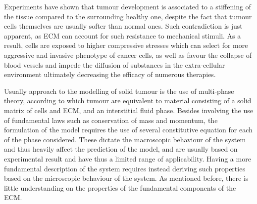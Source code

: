 \documentclass[runningheads]{llncs}
\begin{document}
Experiments have shown that tumour development is associated to a stiffening of the tissue compared to the surrounding healthy one, despite the fact that tumour cells themselves are usually softer than normal ones. Such contradiction is just apparent, as ECM can account for such resistance to mechanical stimuli. As a result, cells are exposed to higher compressive stresses which can select for more aggressive and invasive phenotype of cancer cells, as well as favour the collapse of blood vessels and impede the diffusion of substances in the extra-cellular environment ultimately decreasing the efficacy of numerous therapies.

Usually approach to the modelling of solid tumour is the use of multi-phase theory, according to which tumour are equivalent to material consisting of a solid matrix of cells and ECM, and an interstitial fluid phase. Besides involving the use of fundamental laws such as conservation of mass and momentum, the formulation of the model requires the use of several constitutive equation for each of the phase considered. These dictate the macroscopic behaviour of the system and thus heavily affect the prediction of the model, and are usually based on experimental result and have thus a limited range of applicability. Having a more fundamental description of the system requires instead deriving such properties based on the microscopic behaviour of the system.   As mentioned before, there is little understanding on the properties of the fundamental components of the ECM. 


%
\end{document}

